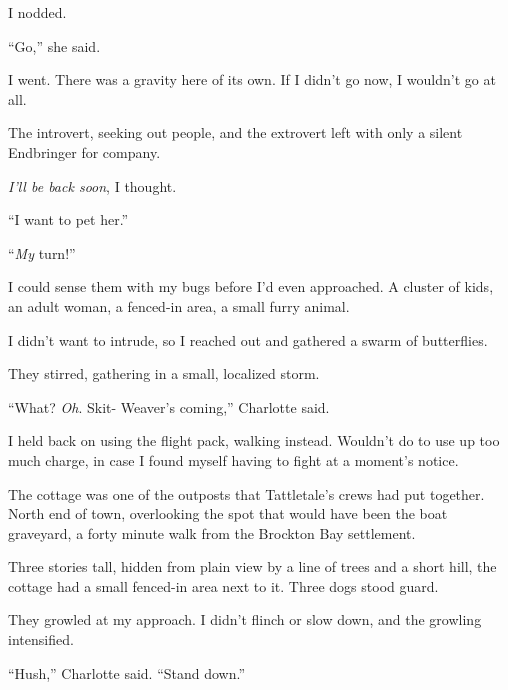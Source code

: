 I nodded.



``Go,'' she said.



I went.  There was a gravity here of its own.  If I didn't go now, I wouldn't go at all.



The introvert, seeking out people, and the extrovert left with only a silent Endbringer for company.



\emph{I'll be back soon}, I thought.



\blacksquare



``I want to pet her.''



``\emph{My} turn!''



I could sense them with my bugs before I'd even approached.  A cluster of kids, an adult woman, a fenced-in area, a small furry animal.



I didn't want to intrude, so I reached out and gathered a swarm of butterflies.



They stirred, gathering in a small, localized storm.



``What?  \emph{Oh}.  Skit- Weaver's coming,'' Charlotte said.



I held back on using the flight pack, walking instead.  Wouldn't do to use up too much charge, in case I found myself having to fight at a moment's notice.



The cottage was one of the outposts that Tattletale's crews had put together.  North end of town, overlooking the spot that would have been the boat graveyard, a forty minute walk from the Brockton Bay settlement.



Three stories tall, hidden from plain view by a line of trees and a short hill, the cottage had a small fenced-in area next to it.  Three dogs stood guard.



They growled at my approach.  I didn't flinch or slow down, and the growling intensified.



``Hush,'' Charlotte said.  ``Stand down.''



